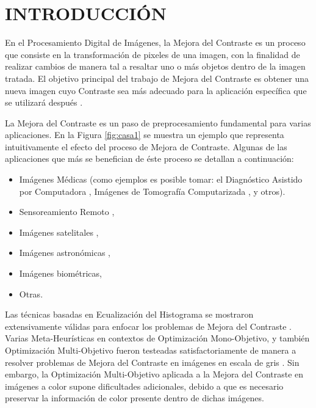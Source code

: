 \chapter{INTRODUCCIÓN}

En el Procesamiento Digital de Imágenes, la Mejora del Contraste es un proceso que consiste en la transformación de pixeles de una imagen, con la finalidad de realizar cambios de manera tal a resaltar uno o más objetos dentro de la imagen tratada. El objetivo principal del trabajo de Mejora del Contraste es obtener una nueva imagen cuyo Contraste sea más adecuado para la aplicación específica que se utilizará después \cite{gonzalez02a}.

La Mejora del Contraste es un paso de preprocesamiento fundamental para varias aplicaciones. En la Figura \ref{fig:casa1} se muestra un ejemplo que representa intuitivamente el efecto del proceso de Mejora de Contraste. Algunas de las aplicaciones que más se benefician de éste proceso se detallan a continuación:

\begin{itemize}
	\item Imágenes Médicas (como ejemplos es posible tomar: el Diagnóstico Asistido por Computadora \cite{doi2007computer}, Imágenes de Tomografía Computarizada \cite{doi:10.1056/NEJM199303113281008}, y otros).
	\item Sensoreamiento Remoto \cite{lillesand2014remote},

	\item Imágenes satelitales \cite{demirel2010satellite},

	\item Imágenes astronómicas \cite{doi:10.1080/00223638.1981.11738127},

	\item Imágenes biométricas\cite{bennet2011fingerprint},

	\item Otras\cite{BEGHDADI1989162}.
	
\end{itemize}



Las técnicas basadas en Ecualización del Histograma se mostraron extensivamente válidas para enfocar los problemas de Mejora del Contraste \cite{pizer1987adaptive,zuiderveld1994contrast,580378}. %
Varias Meta-Heurísticas en contextos de Optimización Mono-Objetivo, y también Optimización Multi-Objetivo fueron testeadas satisfactoriamente de manera a resolver problemas de Mejora del Contraste en imágenes en escala de gris \cite{morepso,more2015parameter,812529,HOSEINI2013879}. Sin embargo, la Optimización Multi-Objetivo aplicada a la Mejora del Contraste en imágenes a color supone dificultades adicionales, debido a que es necesario preservar la información de color presente dentro de dichas imágenes.

